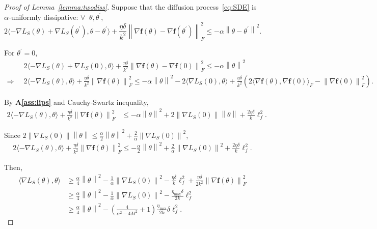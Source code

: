\documentclass{article}
\newcommand{\norm}[1]{\left\lVert#1\right\rVert} %
\begin{document}
\begin{proof}[Proof of Lemma~\ref{lemma:twodiss}]
    Suppose that the diffusion process~\ref{eq:SDE} is $\alpha$-uniformly dissipative: $\forall \;\; \theta, \theta^\prime$,
    $$ 2 \langle -\nabla L_S(\theta) + \nabla L_S(\theta^\prime), \theta-\theta^\prime \rangle + \frac{\eta \delta}{k^2} \norm{\nabla \mathbf{f}(\theta) - \nabla \mathbf{f}(\theta^\prime)}_F^2 \leq -\alpha \norm{\theta - \theta^\prime}^2.$$

    For $\theta^\prime = 0$,
    \begin{align*}
        &2 \langle -\nabla L_S(\theta) + \nabla L_S(0), \theta \rangle + \frac{\eta \delta}{k^2} \norm{\nabla \mathbf{f}(\theta) - \nabla \mathbf{f}(0)}_F^2 \leq -\alpha \norm{\theta}^2\\
        \Rightarrow\;\; &2 \langle -\nabla L_S(\theta) , \theta \rangle + \frac{\eta \delta}{k^2}  \norm{\nabla \mathbf{f}(\theta)}_F^2 \leq -\alpha \norm{\theta}^2 - 2 \langle \nabla L_S(0), \theta\rangle + \frac{\eta \delta}{k^2} \left( 2 \langle \nabla \mathbf{f}(\theta), \nabla \mathbf{f}(0)\rangle_F - \norm{\nabla \mathbf{f}(0)}_F^2 \right).
    \end{align*}

    By \textbf{A\ref{ass:lips}} and Cauchy-Swartz inequality,
    \begin{align*}
        2 \langle -\nabla L_S(\theta) , \theta \rangle + \frac{\eta \delta}{k^2}  \norm{\nabla \mathbf{f}(\theta)}_F^2 
        &\leq -\alpha \norm{\theta}^2 + 2 \norm{\nabla L_S(0)}\norm{\theta} + \frac{2\eta \delta}{k} \ell_f^2.
    \end{align*}

    Since $2\norm{\nabla L_S (0)}\norm{\theta} \leq \frac{\alpha}{2} \norm{\theta}^2 + \frac{2}{\alpha} \norm{\nabla L_S (0)}^2$,
    \begin{align*}
        2 \langle -\nabla L_S(\theta) , \theta \rangle + \frac{\eta \delta}{k^2}  \norm{\nabla \mathbf{f}(\theta)}_F^2 \leq -\frac{\alpha}{2} \norm{\theta}^2 + \frac{2}{\alpha} \norm{\nabla L_S(0)}^2 + \frac{2\eta \delta}{k} \ell_f^2.
    \end{align*}

    Then, 
    \begin{align*}
         \langle \nabla L_S(\theta), \theta \rangle &\geq \frac{\alpha}{4} \norm{\theta}^2 - \frac{1}{\alpha} \norm{\nabla L_S(0)}^2 - \frac{\eta \delta}{k} \ell_f^2 + \frac{\eta \delta}{2 k^2}  \norm{\nabla \mathbf{f}(\theta)}_F^2\\
        &\geq \frac{\alpha}{4} \norm{\theta}^2 - \frac{1}{\alpha} \norm{\nabla L_S(0)}^2 - \frac{\eta_{\max} \delta}{2k} \ell_f^2\\
        &\geq \frac{\alpha}{4} \norm{\theta}^2 - \left(\frac{4}{\alpha^2 - 4M^2} +1 \right) \frac{\eta_{\max}}{2k} \delta \ell_f^2.
    \end{align*}


\end{proof}
\end{document}
